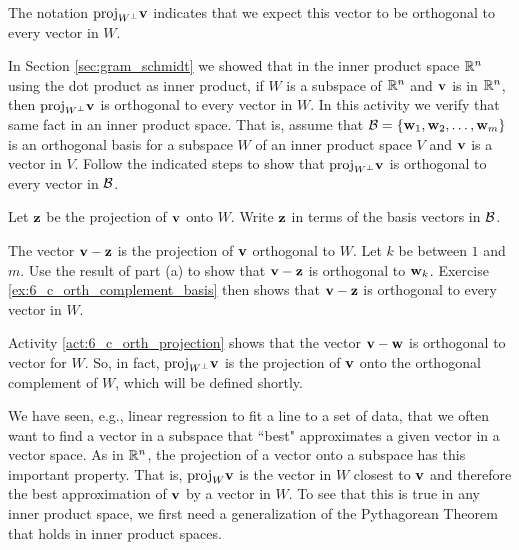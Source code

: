 The notation $\text{proj}_{W^{\perp}} \mathbf{v}$ indicates that we expect this vector to be orthogonal to every vector in $W$. 

\begin{activity} \label{act:6_c_orth_projection} In Section \ref{sec:gram_schmidt} we showed that in the inner product space $\mathbb{R}^n$ using the dot product as inner product, if $W$ is a subspace of $\mathbb{R}^n$ and $\mathbf{v}$ is in $\mathbb{R}^n$, then $\text{proj}_{W^{\perp}} \mathbf{v}$ is orthogonal to every vector in $W$. In this activity we verify that same fact in an inner product space. That is, assume that $\mathcal{B} = \{\mathbf{w}_1, \mathbf{w}_2, \ldots, \mathbf{w}_m\}$ is an orthogonal basis for a subspace $W$ of an inner product space $V$ and $\mathbf{v}$ is a vector in $V$. Follow the indicated steps to show that $\text{proj}_{W^{\perp}} \mathbf{v}$ is orthogonal to every vector in $\mathcal{B}$. 
\ba
\item Let $\mathbf{z}$ be the projection of $\mathbf{v}$ onto $W$. Write $\mathbf{z}$ in terms of the basis vectors in $\mathcal{B}$. 

\item The vector $\mathbf{v} - \mathbf{z}$ is the projection of $\mathbf{v}$ orthogonal to $W$. Let $k$ be between $1$ and $m$. Use the result of part (a) to show that $\mathbf{v} - \mathbf{z}$ is orthogonal to $\mathbf{w}_k$. Exercise  \ref{ex:6_c_orth_complement_basis} then shows that $\mathbf{v} - \mathbf{z}$ is orthogonal to every vector in $W$. 


\ea

\end{activity}

Activity \ref{act:6_c_orth_projection} shows that the vector $\mathbf{v} - \mathbf{w}$ is orthogonal to vector for $W$. So, in fact, $\text{proj}_{W^\perp} \mathbf{v}$ is the projection of $\mathbf{v}$ onto the orthogonal complement of $W$, which will be defined shortly. 
 
 \label{sec:inner_prod_approx}

We have seen, e.g., linear regression to fit a line to a set of data, that we often want to find a vector in a subspace that ``best" approximates a given vector in a vector space. As in $\mathbb{R}^n$, the projection of a vector onto a subspace has this important property.  That is, $\text{proj}_W \mathbf{v}$ is the vector in $W$ closest to $\mathbf{v}$ and therefore the best approximation of $\mathbf{v}$ by a vector in $W$. To see that this is true in any inner product space, we first need a generalization of the Pythagorean Theorem that holds in inner product spaces.

